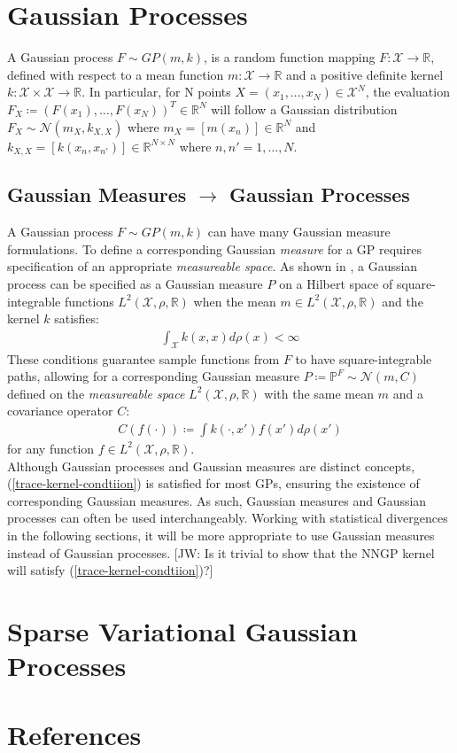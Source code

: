 \documentclass[twoside,11pt]{article}
\newcommand{\jw}[1]{{\color{gray} [JW: #1]}}
\begin{document}
\section{Gaussian Processes \cite{wild2022generalized}}
A Gaussian process $F \sim GP(m, k)$, is a random function mapping $F: \mathcal{X} \rightarrow \mathbb{R}$, defined with respect to a mean function $m: \mathcal{X} \rightarrow \mathbb{R}$ and a positive definite kernel $k: \mathcal{X} \times \mathcal{X} \rightarrow \mathbb{R}$. In particular, for N points $X = (x_1, \dots, x_N) \in \mathcal{X}^N$, the evaluation $F_X \coloneqq (F(x_1), \dots, F(x_N))^T \in \mathbb{R}^N$ will follow a Gaussian distribution $F_X \sim \mathcal{N}(m_X, k_{X, X})$ where $m_X = \left[ m(x_n)\right] \in \mathbb{R}^N$ and $k_{X, X} = \left[ k(x_n, x_{n'})\right] \in \mathbb{R}^{N \times N}$ where $n, n'=1,\dots, N$.

\subsection{Gaussian Measures $\rightarrow$ Gaussian Processes \cite{wild2022generalized}}
A Gaussian process $F \sim GP(m, k)$ can have many Gaussian measure formulations. To define a corresponding Gaussian \textit{measure} for a GP requires specification of an appropriate \textit{measureable space}. As shown in \cite{wild2022generalized}, a Gaussian process can be specified as a Gaussian measure $P$ on a Hilbert space of square-integrable functions $L^2(\mathcal{X}, \rho, \mathbb{R})$ when the mean $m \in L^2(\mathcal{X}, \rho, \mathbb{R})$ and the kernel $k$ satisfies:
\begin{align}
    \int_{\mathcal{X}} k(x, x) d\rho(x) < \infty
    \label{trace-kernel-condtiion}
\end{align}
These conditions guarantee sample functions from $F$ to have square-integrable paths, allowing for a corresponding Gaussian measure $P \coloneqq \mathbb{P}^F \sim \mathcal{N}(m, C)$ defined on the \textit{measureable space} $L^2(\mathcal{X}, \rho, \mathbb{R})$ with the same mean $m$ and a covariance operator $C$:
\begin{align}
    C(f(\cdot)) \coloneqq \int k(\cdot, x')f(x')d \rho(x')
    \label{gm-covariance-operator}
\end{align}
for any function $f \in L^2(\mathcal{X}, \rho, \mathbb{R})$. \\
\newline 
Although Gaussian processes and Gaussian measures are distinct concepts, (\ref{trace-kernel-condtiion}) is satisfied for most GPs, ensuring the existence of corresponding Gaussian measures. As such, Gaussian measures and Gaussian processes can often be used interchangeably. Working with statistical divergences in the following sections, it will be more appropriate to use Gaussian measures instead of Gaussian processes.
\jw{Is it trivial to show that the NNGP kernel will satisfy (\ref{trace-kernel-condtiion})?}
\section{Sparse Variational Gaussian Processes \cite{wild2023connections}}


\begingroup
\let\clearpage\relax
\AtNextBibliography{\small}
\section*{References}
\printbibliography[heading=talikarng, title = {References}]
\endgroup
\end{document}
